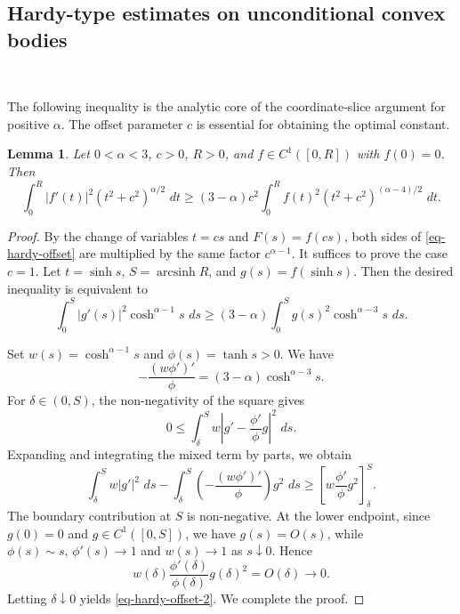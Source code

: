 \documentclass[12pt,leqno]{amsart}
\theoremstyle{plain} \newtheorem{thm}{Theorem}[section]
\theoremstyle{plain} \newtheorem{prop}[thm]{Proposition}
\theoremstyle{plain} \newtheorem{prob}[thm]{Problem}
\theoremstyle{definition} \newtheorem{defi}[thm]{Definition}
\theoremstyle{plain} \newtheorem{cor}[thm]{Corollary}
\theoremstyle{plain} \newtheorem{lem}[thm]{Lemma}
\theoremstyle{plain} \newtheorem{eg}{Example}[section]
\theoremstyle{remark} \newtheorem{rmk}[thm]{Remark}
\theoremstyle{plain} \newtheorem{conj}{Conjecture}
\numberwithin{equation}{section}
\newcommand{\dd}{\,d}
\begin{document}
\subsection{Hardy-type estimates on unconditional convex bodies}\
\label{sec-hardy-slices}

The following inequality is the analytic core of the coordinate‑slice
argument for positive $\alpha$. The offset parameter $c$ is essential for obtaining the
optimal constant.

\begin{lem}\label{lem-hardy-offset} 
  Let $0<\alpha<3$, $c>0$, $R>0$, and $f\in C^1([0,R])$ with
  $f(0)=0$.  Then
  \begin{equation}\label{eq-hardy-offset}
    \int_0^R|f'(t)|^2(t^2+c^2)^{\alpha/2}\,\dd t
    \ge(3-\alpha)c^2
    \int_0^R f(t)^2(t^2+c^2)^{(\alpha-4)/2}\,\dd t.
  \end{equation}
\end{lem}

\begin{proof}
  By the change of variables $t=cs$ and $F(s)=f(cs)$, both sides of
  \eqref{eq-hardy-offset} are multiplied by the same factor
  $c^{\alpha-1}$.  It suffices to prove the case $c=1$. Let $t=\sinh s$, $S=\operatorname{arcsinh}R$, and $g(s)=f(\sinh s)$. Then the desired inequality is equivalent to
  \begin{equation}\label{eq-hardy-offset-2}
       \int_0^S |g'(s)|^2\cosh^{\alpha-1}s\,\dd s
    \ge
    (3-\alpha)
    \int_0^S g(s)^2\cosh^{\alpha-3}s\,\dd s .
  \end{equation}

  Set $w(s)=\cosh^{\alpha-1}s$ and $\phi(s)=\tanh s>0$. We have
    \[-\frac{(w\phi')'}{\phi}
    =(3-\alpha)\cosh^{\alpha-3}s.\]
  For $\delta\in(0,S)$, the non-negativity of the square gives
  \[
    0
    \le
    \int_\delta^S
    w\left|g'-\frac{\phi'}{\phi}g\right|^2\,\dd s .
  \]
  Expanding and integrating the mixed term by parts, we obtain
  \[
    \int_\delta^S w|g'|^2\,\dd s
    -
    \int_\delta^S
    \left(-\frac{(w\phi')'}{\phi}\right)g^2\,\dd s
    \ge
    \left[
      w\frac{\phi'}{\phi}g^2
    \right]_{\delta}^{S}.
  \]
  The boundary contribution at $S$ is non-negative. At the lower
  endpoint, since $g(0)=0$ and $g\in C^1([0,S])$, we have
  $g(s)=O(s)$, while $ \phi(s)\sim s,\,\phi'(s)\to1$ and $w(s)\to1$ as $s\downarrow0$. Hence
  \[
    w(\delta)\frac{\phi'(\delta)}{\phi(\delta)}g(\delta)^2
    =O(\delta)\to0 .
  \]
  Letting $\delta\downarrow0$ yields \eqref{eq-hardy-offset-2}. We complete the proof.
\end{proof}
\end{document}
